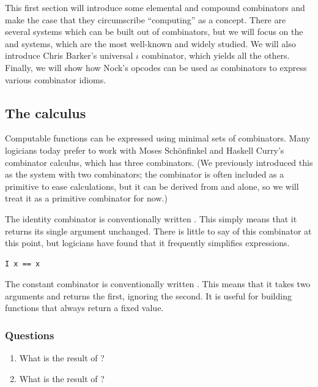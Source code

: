 This first section will introduce some elemental and compound combinators and make the case that they circumscribe ``computing'' as a concept.  There are several systems which can be built out of combinators, but we will focus on the  and  systems, which are the most well-known and widely studied.  We will also introduce Chris Barker's universal $\iota$ combinator, which yields all the others.  Finally, we will show how Nock's opcodes can be used as combinators to express various combinator idioms.

\subsection{The  calculus}

Computable functions can be expressed using minimal sets of combinators.  Many logicians today prefer to work with Moses Schönfinkel and Haskell Curry's  combinator calculus, which has three combinators.  (We previously introduced this as the  system with two combinators; the  combinator is often included as a primitive to ease calculations, but it can be derived from  and  alone, so we will treat it as a primitive combinator for now.)

The identity combinator  is conventionally written .  This simply means that it returns its single argument unchanged.  There is little to say of this combinator at this point, but logicians have found that it frequently simplifies expressions.

\begin{lstlisting}[style=listingcomb,frame=tb]
I x == x
\end{lstlisting}

The constant combinator  is conventionally written .  This means that it takes two arguments and returns the first, ignoring the second.  It is useful for building functions that always return a fixed value.

\subsubsection{Questions}

\begin{enumerate}
  \item  What is the result of ?
  \item  What is the result of ?
\end{enumerate}

